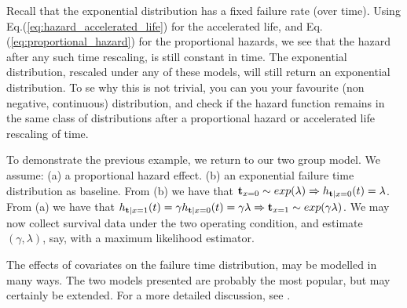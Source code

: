 \begin{example}
Recall that the exponential distribution has a fixed failure rate (over time). 
Using Eq.(\ref{eq:hazard_accelerated_life}) for the accelerated life, and Eq.(\ref{eq:proportional_hazard}) for the proportional hazards, we see that the hazard after any such time rescaling, is still constant in time. 
The exponential distribution, rescaled under any of these models, will still return an exponential distribution.
To se why this is not trivial, you can you your favourite (non negative, continuous) distribution, and check if the hazard function remains in the same class of distributions after a proportional hazard or accelerated life rescaling of time.
\end{example}


\begin{example}
To demonstrate the previous example, we return to our two group model.
We assume: 
(a) a proportional hazard effect.
(b) an exponential failure time distribution as baseline.
From (b) we have that $\mathbf{t}_{x=0}\sim exp(\lambda) \Rightarrow h_{\mathbf{t}|x=0} (t)=\lambda$. 
From (a) we have that $h_{\mathbf{t}|x=1} (t)=\gamma h_{\mathbf{t}|x=0} (t)= \gamma \lambda \Rightarrow \mathbf{t}_{x=1}\sim exp(\gamma \lambda) $.
We may now collect survival data under the two operating condition, and estimate $(\gamma, \lambda)$, say, with a maximum likelihood estimator. 
\end{example}






\begin{extra}
The effects of covariates on the failure time distribution, may be modelled in many ways. 
The two models presented are probably the most popular, but may certainly be extended. 
For a more detailed discussion, see \cite{cox_analysis_1984}.
\end{extra}





